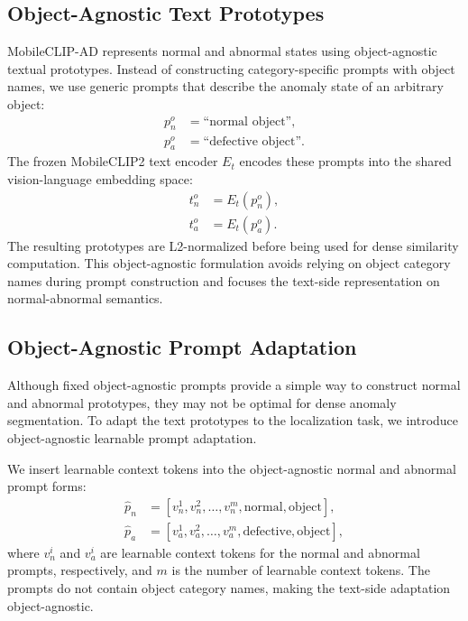 \documentclass[10pt]{article}
\begin{document}
\subsection{Object-Agnostic Text Prototypes}

MobileCLIP-AD represents normal and abnormal states using object-agnostic textual prototypes. Instead of constructing category-specific prompts with object names, we use generic prompts that describe the anomaly state of an arbitrary object:
\begin{align}
p_n^{o} &= \text{``normal object''}, \\
p_a^{o} &= \text{``defective object''}.
\label{eq:object_prompts}
\end{align}
The frozen MobileCLIP2 text encoder $E_t$ encodes these prompts into the shared vision-language embedding space:
\begin{align}
t_n^{o} &= E_t(p_n^{o}), \\
t_a^{o} &= E_t(p_a^{o}).
\label{eq:object_text_proto}
\end{align}
The resulting prototypes are L2-normalized before being used for dense similarity computation. This object-agnostic formulation avoids relying on object category names during prompt construction and focuses the text-side representation on normal-abnormal semantics.

\subsection{Object-Agnostic Prompt Adaptation}

Although fixed object-agnostic prompts provide a simple way to construct normal and abnormal prototypes, they may not be optimal for dense anomaly segmentation. To adapt the text prototypes to the localization task, we introduce object-agnostic learnable prompt adaptation.

We insert learnable context tokens into the object-agnostic normal and abnormal prompt forms:
\begin{align}
\hat{p}_n &=
[v_n^1, v_n^2, \ldots, v_n^m, \mathrm{normal}, \mathrm{object}], \\
\hat{p}_a &=
[v_a^1, v_a^2, \ldots, v_a^m, \mathrm{defective}, \mathrm{object}],
\label{eq:object_learnable_prompt}
\end{align}
where $v_n^i$ and $v_a^i$ are learnable context tokens for the normal and abnormal prompts, respectively, and $m$ is the number of learnable context tokens. The prompts do not contain object category names, making the text-side adaptation object-agnostic.
\end{document}
